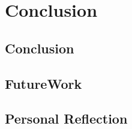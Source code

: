 \chapter{Conclusion}
\label{chapter6}

\section{Conclusion}
\lipsum[1-1]

\section{FutureWork}
\lipsum[1-1]

\section{Personal Reflection}
\lipsum[1-1]